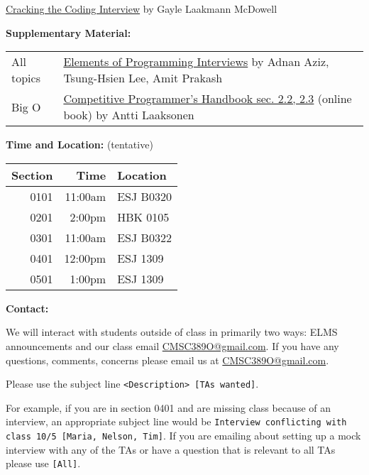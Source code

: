 \documentclass[12pt]{article}
\begin{document}
\noindent\href{https://www.amazon.com/Cracking-Coding-Interview-Programming-Questions/dp/0984782850/}{Cracking the Coding Interview}
{\small by Gayle Laakmann McDowell} \medskip

\noindent\textbf{Supplementary Material: }

\begin{table}[hbt!]
  \begin{tabular}{@{}ll}
    All topics & \href{https://www.amazon.com/Elements-Programming-Interviews-Python-Insiders/dp/1537713949}{Elements of Programming Interviews} {\small by Adnan Aziz, Tsung-Hsien Lee, Amit Prakash} \\
    Big O & \href{https://cses.fi/book/index.html}{Competitive Programmer's Handbook sec. 2.2, 2.3} {\small (online book) by Antti Laaksonen} \\ 
  \end{tabular}
\end{table}


\medskip

\noindent\textbf{Time and Location:}
(tentative)
\begin{table}[H]
  \begin{tabular}{rrl}
    Section & Time    & Location  \\
    \hline
    0101 & 11:00am & ESJ B0320 \\
    0201 & 2:00pm  & HBK 0105  \\
    0301 & 11:00am & ESJ B0322 \\
    0401 & 12:00pm & ESJ 1309  \\
    0501 & 1:00pm  & ESJ 1309
  \end{tabular}
\end{table}
\medskip
\newpage %
\noindent\textbf{Contact: }

\noindent We will interact with students outside of class in primarily two ways:
ELMS announcements and our class email \href{mailto:CMSC389O@gmail.com}{CMSC389O@gmail.com}.
If you have any questions, comments, concerns please email us at \href{mailto:CMSC389O@gmail.com}{CMSC389O@gmail.com}.

Please use the subject line \texttt{<Description> [TAs wanted]}.

For example, if you are in section 0401 and are missing class because of an interview,
an appropriate subject line would be
\texttt{Interview conflicting with class 10/5 [Maria, Nelson, Tim]}.
If you are emailing about setting up a mock interview with any of the TAs
or have a question that is relevant to all TAs please use \texttt{[All]}.
\end{document}
